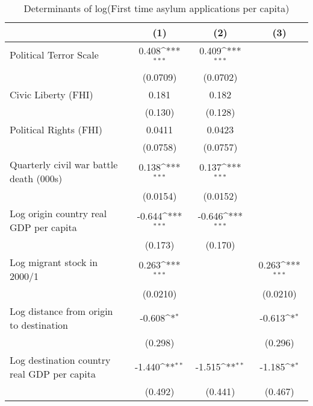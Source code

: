 \begin{table}[htbp]\centering
\def\sym#1{\ifmmode^{#1}\else\(^{#1}\)\fi}
\caption{Determinants of log(First time asylum applications per capita)}
\begin{tabular}{l*{3}{c}}
\hline\hline
                    &\multicolumn{1}{c}{(1)}         &\multicolumn{1}{c}{(2)}         &\multicolumn{1}{c}{(3)}         \\
\hline
Political Terror Scale&       0.408\sym{***}&       0.409\sym{***}&                     \\
                    &    (0.0709)         &    (0.0702)         &                     \\
[0.5em]
Civic Liberty (FHI) &       0.181         &       0.182         &                     \\
                    &     (0.130)         &     (0.128)         &                     \\
[0.5em]
Political Rights (FHI)&      0.0411         &      0.0423         &                     \\
                    &    (0.0758)         &    (0.0757)         &                     \\
[0.5em]
Quarterly civil war battle death (000s)&       0.138\sym{***}&       0.137\sym{***}&                     \\
                    &    (0.0154)         &    (0.0152)         &                     \\
[0.5em]
Log origin country real GDP per capita&      -0.644\sym{***}&      -0.646\sym{***}&                     \\
                    &     (0.173)         &     (0.170)         &                     \\
[0.5em]
Log migrant stock in 2000/1&       0.263\sym{***}&                     &       0.263\sym{***}\\
                    &    (0.0210)         &                     &    (0.0210)         \\
[0.5em]
Log distance from origin to destination&      -0.608\sym{*}  &                     &      -0.613\sym{*}  \\
                    &     (0.298)         &                     &     (0.296)         \\
[0.5em]
Log destination country real GDP per capita&      -1.440\sym{**} &      -1.515\sym{**} &      -1.185\sym{*}  \\
                    &     (0.492)         &     (0.441)         &     (0.467)         \\

\end{tabular}
\end{table}
